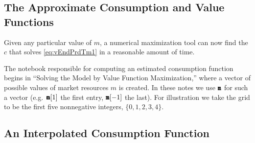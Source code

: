\documentclass[titlepage, headings=optiontotocandhead]{econark}
\begin{document}
{\subsection{The Approximate Consumption and Value Functions}

Given any particular value of $m$, a numerical maximization tool can now find the $c$ that solves \eqref{eq:vEndPrdTm1} in a reasonable amount of time.

The notebook responsible for computing an estimated consumption function begins in ``Solving the Model by Value Function Maximization,'' where a vector of possible values of market resources $m$ is created.  In these notes we use $\pmb{\mathtt{{m}}}$ for such a vector (e.g.\ $\pmb{\mathtt{{m}}}[1]$ the first entry, $\pmb{\mathtt{{m}}}[-1]$ the last).  For illustration we take the grid to be the first five nonnegative integers, $\{0,1,2,3,4\}$.



\hypertarget{an-interpolated-consumption-function}{}
\subsection{An Interpolated Consumption Function} \label{subsec:LinInterp}


}
\end{document}
